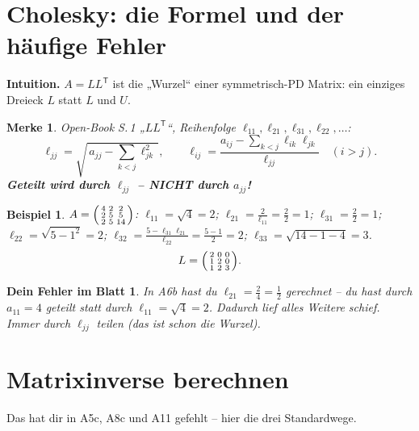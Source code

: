\documentclass[a4paper,11pt]{article}
\newenvironment{psmallmatrix}{\left(\begin{smallmatrix}}{\end{smallmatrix}\right)}
\newcommand{\transp}{^{\mathsf{T}}}
\theoremstyle{def0}
\newtheorem*{merke}{\textcolor{good}{Merke}}
\newtheorem*{fehler}{\textcolor{bad}{Dein Fehler im Blatt}}
\newtheorem*{bsp}{Beispiel}
\begin{document}
\section{Cholesky: die Formel und der häufige Fehler}

\textbf{Intuition.} $A=LL\transp$ ist die „Wurzel“ einer symmetrisch-PD Matrix: ein
einziges Dreieck $L$ statt $L$ und $U$.

\begin{merke}
Open-Book S.\,1 „$LL\transp$“, Reihenfolge $\ell_{11},\ell_{21},\ell_{31},\ell_{22},\dots$:
\[
\ell_{jj}=\sqrt{\,a_{jj}-\textstyle\sum_{k<j}\ell_{jk}^2\,},\qquad
\ell_{ij}=\frac{a_{ij}-\sum_{k<j}\ell_{ik}\ell_{jk}}{\boxed{\ell_{jj}}}\quad(i>j).
\]
\textbf{Geteilt wird durch $\ell_{jj}$ -- NICHT durch $a_{jj}$!}
\end{merke}

\begin{bsp}
$A=\begin{psmallmatrix}4&2&2\\2&5&5\\2&5&14\end{psmallmatrix}$:\;
$\ell_{11}=\sqrt4=2$;\;
$\ell_{21}=\tfrac{2}{\ell_{11}}=\tfrac22=1$;\;
$\ell_{31}=\tfrac{2}{2}=1$;\;
$\ell_{22}=\sqrt{5-1^2}=2$;\;
$\ell_{32}=\tfrac{5-\ell_{31}\ell_{21}}{\ell_{22}}=\tfrac{5-1}{2}=2$;\;
$\ell_{33}=\sqrt{14-1-4}=3$.
\[
L=\begin{psmallmatrix}2&0&0\\1&2&0\\1&2&3\end{psmallmatrix}.
\]
\end{bsp}

\begin{fehler}
In A6b hast du $\ell_{21}=\tfrac{2}{4}=\tfrac12$ gerechnet -- du hast durch $a_{11}=4$
geteilt statt durch $\ell_{11}=\sqrt4=2$. Dadurch lief alles Weitere schief. Immer durch
$\ell_{jj}$ teilen (das ist schon die Wurzel).
\end{fehler}

\section{Matrixinverse berechnen}

Das hat dir in A5c, A8c und A11 gefehlt -- hier die drei Standardwege.
\end{document}
